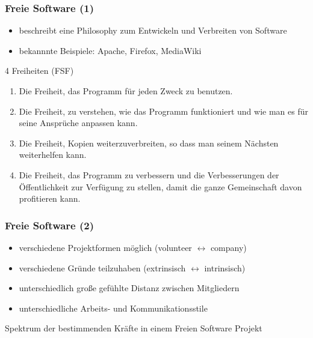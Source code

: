 \documentclass{beamer}
\begin{document}
\begin{frame}
\frametitle{Freie Software (1)}
\begin{itemize}
 \item beschreibt eine Philosophy zum Entwickeln und Verbreiten von Software
 \item bekannnte Beispiele: Apache, Firefox, MediaWiki
\end{itemize}

\begin{block}{4 Freiheiten (FSF)}
    \begin{enumerate}
      \item Die Freiheit, das Programm für jeden Zweck zu benutzen.
      \item Die Freiheit, zu verstehen, wie das Programm funktioniert und wie man es für seine Ansprüche anpassen kann.
      \item Die Freiheit, Kopien weiterzuverbreiten, so dass man seinem Nächsten weiterhelfen kann.
      \item Die Freiheit, das Programm zu verbessern und die Verbesserungen der Öffentlichkeit zur Verfügung zu stellen, damit die ganze Gemeinschaft davon profitieren kann.
    \end{enumerate}
\end{block}
\end{frame}

\begin{frame}
\frametitle{Freie Software (2)}
\begin{itemize}
 \item verschiedene Projektformen m\"oglich (volunteer $\leftrightarrow$ company)
 \item verschiedene Gr\"unde teilzuhaben (extrinsisch $\leftrightarrow$ intrinsisch)
 \item unterschiedlich gro\ss e gef\"uhlte Distanz zwischen Mitgliedern
 \item unterschiedliche Arbeits- und Kommunikationsstile
\end{itemize}

\begin{block}{Spektrum der bestimmenden Kr\"afte in einem Freien Software Projekt}
\begin{figure}[h]
	\centering
\end{figure}
\end{block}
\end{frame}
\end{document}

